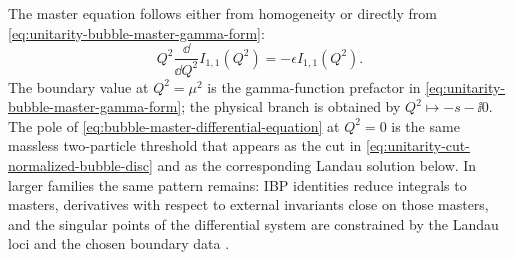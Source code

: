 The master equation follows either from homogeneity or directly from
\eqref{eq:unitarity-bubble-master-gamma-form}:
\begin{equation}
  Q^2\frac{\dd}{\dd Q^2}I_{1,1}(Q^2)
  =
  -\epsilon I_{1,1}(Q^2).
  \label{eq:bubble-master-differential-equation}
\end{equation}
The boundary value at \(Q^2=\mu^2\) is the gamma-function prefactor in
\eqref{eq:unitarity-bubble-master-gamma-form}; the physical branch is obtained
by \(Q^2\mapsto -s-\ii0\).  The pole of
\eqref{eq:bubble-master-differential-equation} at \(Q^2=0\) is the same
massless two-particle threshold that appears as the cut in
\eqref{eq:unitarity-cut-normalized-bubble-disc} and as the corresponding
Landau solution below.  In larger families the same pattern remains: IBP
identities reduce integrals to masters, derivatives with respect to external
invariants close on those masters, and the singular points of the differential
system are constrained by the Landau loci and the chosen boundary data
\cite{PassarinoVeltman1979,ChetyrkinTkachov1981IBP,
Tkachov1981AnalyticalCalculability,Kotikov1991DifferentialEquations,
GehrmannRemiddi2000DifferentialEquations}.

